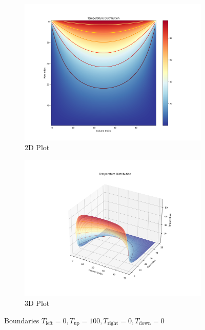 \documentclass{article}
\begin{document}
\begin{figure}[H]
  \begin{subfigure}{0.45\textwidth}
    \includegraphics[width=\linewidth]{figures/Figure_9.png}
    \caption{2D Plot}
  \end{subfigure}
  \hfill
  \begin{subfigure}{0.45\textwidth}
    \includegraphics[width=\linewidth]{figures/Figure_10.png}
    \caption{3D Plot}
  \end{subfigure}
  \caption{Boundaries $T_{\text{left}}=0, T_{\text{up}}=100, T_{\text{right}}=0, T_{\text{down}}=0$}
\end{figure}
\end{document}
